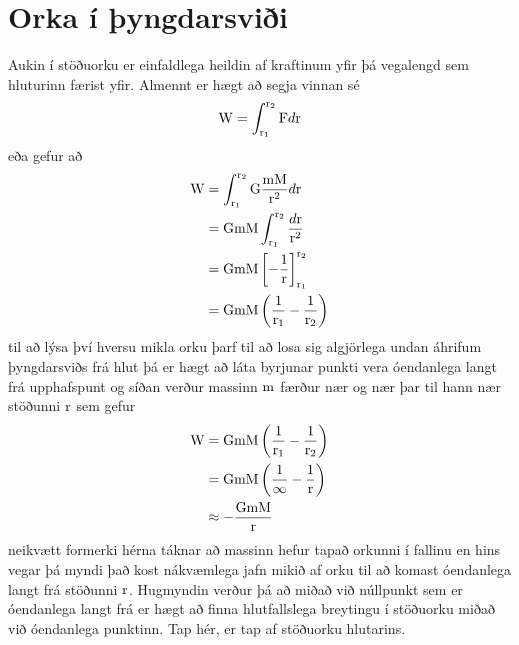 \section{Orka í þyngdarsviði}
Aukin í stöðuorku er einfaldlega heildin af kraftinum yfir þá vegalengd sem
hluturinn færist yfir. Almennt er hægt að segja vinnan sé
\[
	\textrm{W} = \int_{\textrm{r}_1}^{\textrm{r}_2} \textrm{F} d\textrm{r}
\]
eða gefur að
\begin{align*}
	\textrm{W} &= \int_{\textrm{r}_1}^{\textrm{r}_2} 
		\text{G} \frac{\textrm{m} \textrm{M}}{\textrm{r}^2} d\textrm{r} \\
		&= \text{G} \textrm{m} \textrm{M} 
			\int_{\textrm{r}_1}^{\textrm{r}_2} \frac{d\textrm{r}}{\textrm{r}^2} \\
		&= \text{G} \textrm{m} \textrm{M} 
			\left[ - \frac{1}{\textrm{r}} \right]_{\textrm{r}_1}^{\textrm{r}_2} \\
		&= \text{G} \textrm{m} \textrm{M} 
			\left( \frac{1}{\textrm{r}_1} - \frac{1}{\textrm{r}_2} \right)
\end{align*}
til að lýsa því hversu mikla orku þarf til að losa sig algjörlega undan áhrifum
þyngdarsviðs frá hlut þá er hægt að láta byrjunar punkti vera óendanlega langt
frá upphafspunt og síðan verður massinn $\textrm{m}$ færður nær og nær þar til hann
nær stöðunni $\textrm{r}$ sem gefur
\begin{align*}
	\textrm{W} &= \text{G} \textrm{m} \textrm{M} 
			\left( \frac{1}{\textrm{r}_1} - \frac{1}{\textrm{r}_2} \right) \\
		&= \text{G} \textrm{m} \textrm{M} 
			\left( \frac{1}{\infty} - \frac{1}{\textrm{r}} \right) \\
		&\approx -\frac{\text{G} \textrm{m} \textrm{M}}{\textrm{r}}
\end{align*}
neikvætt formerki hérna táknar að massinn hefur tapað orkunni í fallinu en hins
vegar þá myndi það kost nákvæmlega jafn mikið af orku til að komast óendanlega
langt frá stöðunni $\textrm{r}$. Hugmyndin verður þá að miðað við núllpunkt sem
er óendanlega langt frá er hægt að finna hlutfallslega breytingu í stöðuorku miðað
við óendanlega punktinn. Tap hér, er tap af stöðuorku hlutarins.

